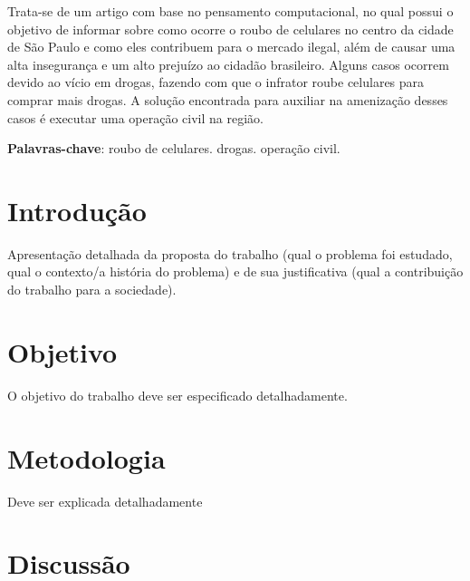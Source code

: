 \documentclass[
	article,			
	11pt,				
	oneside,			
	a4paper,			
	english,			
	brazil,				
	sumario=tradicional
	]{abntex2}
\begin{document}
\frenchspacing 
\maketitle

\begin{resumoumacoluna}
    
    Trata-se de um artigo com base no pensamento computacional, no qual possui o objetivo de 
    informar sobre como ocorre o roubo de celulares no centro da cidade de São Paulo e como
    eles contribuem para o mercado ilegal, além de causar uma alta insegurança e um alto prejuízo ao
    cidadão brasileiro. Alguns casos ocorrem devido ao vício em drogas, fazendo com que o
    infrator roube celulares para comprar mais drogas. A solução encontrada para auxiliar na
    amenização desses casos é executar uma operação civil na região.
    
    \vspace{\onelineskip}
    
    \noindent
    \textbf{Palavras-chave}: roubo de celulares. drogas. operação civil.
\end{resumoumacoluna}

\textual

\newpage
% 
\section{Introdução}

    Apresentação detalhada da proposta do trabalho (qual o problema foi estudado,
    qual o contexto/a história do problema) e de sua justificativa (qual a
    contribuição do trabalho para a sociedade).

\newpage
% 
\section{Objetivo}

    O objetivo do trabalho deve ser especificado detalhadamente.

\newpage
% 
\section{Metodologia}

    Deve ser explicada detalhadamente

\newpage
% 
\section{Discussão}
\end{document}
